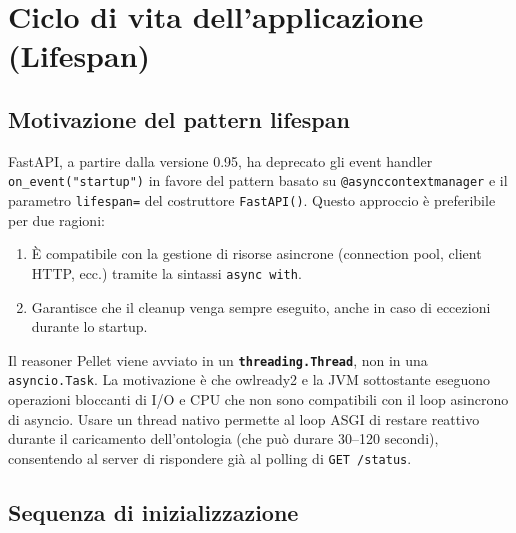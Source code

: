\documentclass[a4paper,12pt]{article}
\begin{document}
\section{Ciclo di vita dell'applicazione (Lifespan)}

\subsection{Motivazione del pattern lifespan}

FastAPI, a partire dalla versione 0.95, ha deprecato gli event handler
\texttt{on\_event("startup")} in favore del pattern basato su
\texttt{@asynccontextmanager} e il parametro \texttt{lifespan=} del
costruttore \texttt{FastAPI()}. Questo approccio \`{e} preferibile per due
ragioni:
\begin{enumerate}
  \item \`{E} compatibile con la gestione di risorse asincrone (connection pool,
        client HTTP, ecc.) tramite la sintassi \texttt{async with}.
  \item Garantisce che il cleanup venga sempre eseguito, anche in caso di
        eccezioni durante lo startup.
\end{enumerate}

\begin{infobox}
Il reasoner Pellet viene avviato in un \textbf{\texttt{threading.Thread}},
non in una \texttt{asyncio.Task}. La motivazione \`{e} che owlready2 e la JVM
sottostante eseguono operazioni bloccanti di I/O e CPU che non sono
compatibili con il loop asincrono di asyncio. Usare un thread nativo
permette al loop ASGI di restare reattivo durante il caricamento
dell'ontologia (che pu\`{o} durare 30--120 secondi), consentendo al server di
rispondere gi\`{a} al polling di \texttt{GET /status}.
\end{infobox}

\subsection{Sequenza di inizializzazione}
\end{document}
